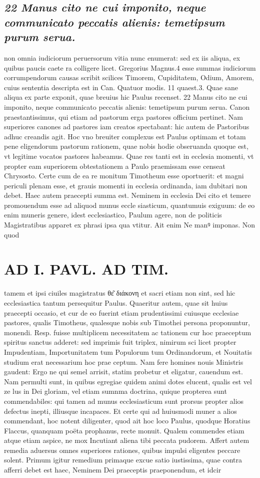 \documentclass{article}
\begin{document}
\begin{pages}
\subsection*{\textit{22 Manus cito ne cui imponito, neque communicato peccatis alienis: temetipsum purum serua.}}non omnia iudiciorum peruersorum vitia nunc enumerat: sed ex iis aliqua, ex quibus paucis caete ra colligere licet. Gregorius Magnus.4 esse summas iudiciorum corrumpendorum causas scribit scilices Timorem, Cupiditatem, Odium, Amorem, cuius sententia descripta est in Can. Quatuor modis. 11 quaest.3. Quae sane aliqua ex parte exponit, quae breuius hic Paulus recenset. 22 Manus cito ne cui imponito, neque communicato peccatis alienis: temetipsum purum serua. Canon praestantissimus, qui etiam ad pastorum erga pastores officium pertinet. Nam superiores canones ad pastores iam creatos spectabant: hic autem de Pastoribus adhuc creandis agit. Hoc vno breuiter complexus est Paulus optimam et totam pene eligendorum pastorum rationem, quae nobis hodie obseruanda quoque est, vt legitime vocatos pastores habeamus. Quae res tanti est in ecclesia momenti, vt propter eam superiorem obtestationem a Paulo praemissam esse censeat Chrysosto. Certe cum de ea re monitum Timotheum esse oportuerit: et magni periculi plenam esse, et grauis momenti in ecclesia ordinanda, iam dubitari non debet. Haec autem praecepti summa est. Neminem in ecclesia Dei cito et temere promouendum esse ad aliquod munus eccle siasticum, quantumuis exiguum: de eo enim muneris genere, idest ecclesiastico, Paulum agere, non de politicis Magistratibus apparet ex phrasi ipsa qua vtitur. Ait enim Ne manꝰ imponas. Non quod  \pend
\section*{AD I. PAVL. AD TIM. }
\marginpar{[ p.338 ]}\pstart tamem et ipsi ciuiles magistratus θε͂ διάκονη et sacri etiam non sint, sed hic ecclesiastica tantum persequitur Paulus. Quaeritur autem, quae sit huius praecepti occasio, et cur de eo fuerint etiam prudentissimi cuiusque ecclesiae pastores, qualis Timotheus, qualesque nobis sub Timothei persona proponuntur, monendi. Resp. fuisse multiplicem necessitatem ac tationem cur hoc praeceptum spiritus sanctus adderet: sed imprimis fuit triplex, nimirum sci licet propter Impudentiam, Importunitatem tum Populorum tum Ordinandorum, et Nouitatis studium erat necessarium hoc prae ceptum. Nam fere homines nouis Ministris gaudent: Ergo ne qui semel arrisit, statim probetur et eligatur, cauendum est. Nam permulti sunt, in quibus egregiae quidem animi dotes elucent, qualis est vel ze lus in Dei gloriam, vel etiam sumnma doctrina, quique propterea sunt commendabiles: qui tamen ad munus ecclesiasticum sunt prorsus propter alios defectus inepti, illiusque incapaces. Et certe qui ad huiusmodi muner a alios commendant, hoc notent diligenter, quod ait hoc loco Paulus, quodque Horatius Flaccus, quanquam poëta prophanus, recte monuit. Qualem commendes etiam atque etiam aspice, ne mox Incutiant aliena tibi peccata pudorem. Affert autem remedia aduersus omnes superiores rationes, quibus impulsi eligentes peccare solent. Primum igitur remedium primaque excue satio iustissima, quae contra afferri debet est haec, Neminem Dei praeceptis praeponendum, et idcir  \pend

\end{pages}
\end{document}
